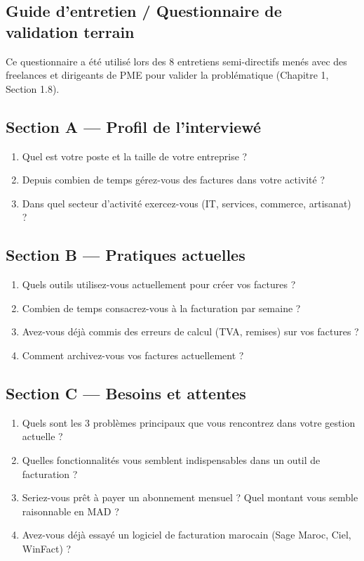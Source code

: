 \documentclass[12pt,a4paper]{report}
\begin{document}
\begin{appendices}
\renewcommand{\chaptername}{Annexe}

\chapter{Guide d'entretien / Questionnaire de validation terrain}

Ce questionnaire a été utilisé lors des 8 entretiens semi-directifs menés avec des freelances et dirigeants de PME pour valider la problématique (Chapitre 1, Section 1.8).

\section*{Section A — Profil de l'interviewé}
\begin{enumerate}
    \item Quel est votre poste et la taille de votre entreprise ?
    \item Depuis combien de temps gérez-vous des factures dans votre activité ?
    \item Dans quel secteur d'activité exercez-vous (IT, services, commerce, artisanat) ?
\end{enumerate}

\section*{Section B — Pratiques actuelles}
\begin{enumerate}
    \item Quels outils utilisez-vous actuellement pour créer vos factures ?
    \item Combien de temps consacrez-vous à la facturation par semaine ?
    \item Avez-vous déjà commis des erreurs de calcul (TVA, remises) sur vos factures ?
    \item Comment archivez-vous vos factures actuellement ?
\end{enumerate}

\section*{Section C — Besoins et attentes}
\begin{enumerate}
    \item Quels sont les 3 problèmes principaux que vous rencontrez dans votre gestion actuelle ?
    \item Quelles fonctionnalités vous semblent indispensables dans un outil de facturation ?
    \item Seriez-vous prêt à payer un abonnement mensuel ? Quel montant vous semble raisonnable en MAD ?
    \item Avez-vous déjà essayé un logiciel de facturation marocain (Sage Maroc, Ciel, WinFact) ?
\end{enumerate}


\end{appendices}
\end{document}
